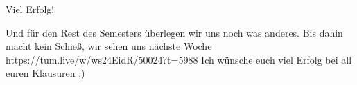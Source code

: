 \documentclass[
  german,            %
  aspectratio=169,    %
]{tumbeamer}
\begin{document}
\begin{frame}[c]{Viel Erfolg!}{}
  \begin{center}
	Und für den Rest des Semesters überlegen wir uns noch was anderes. Bis dahin macht kein Schieß, wir sehen uns nächste Woche https://tum.live/w/ws24EidR/50024?t=5988
	\LARGE Ich wünsche euch viel Erfolg bei all euren Klausuren ;)
  \end{center}
\end{frame}
\end{document}
